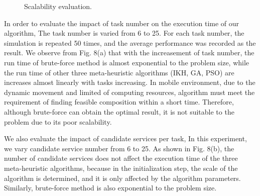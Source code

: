 \documentclass[10pt,journal,compsoc]{IEEEtran}
\begin{document}
\begin{figure}[!t]
\centering
{}
\hfil
{}

\caption{Scalability evaluation.} \label{fig_sim}
\end{figure}

In order to evaluate the impact of task number on the execution time of our algorithm, The task number is varied from 6 to 25. For each task number, the simulation is repeated 50 times, and the average performance was recorded as the result. We observe from Fig. 8(a) that with the increasement of task number, the run time of brute-force method is almost exponential to the problem size, while the run time of other three meta-heuristic algorithms (IKH, GA, PSO) are increases almost linearly with tasks increasing. In mobile environment, due to the dynamic movement and limited of computing resources, algorithm must meet the requirement of finding feasible composition within a short time. Therefore, although brute-force can obtain the optimal result, it is not suitable to the problem due to its poor scalability. 

We also evaluate the impact of candidate services per task, In this experiment, we vary candidate service number from 6 to 25. As shown in Fig. 8(b), the number of candidate services does not affect the execution time of the three meta-heuristic algorithms, because in the initialization step, the scale of the algorithm is determined, and it is only affected by the algorithm parameters. Similarly, brute-force method is also exponential to the problem size. 
\end{document}
